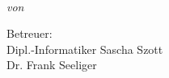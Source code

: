 \begin{titlepage}
    \vspace*{5cm}
    \makeatletter
    \begin{center}
      \begin{Large}
        \@title
      \end{Large}\\[0.1cm]
      \emph{von}\\
      \@author
    \end{center}
    \vspace{7.5 cm}
     Betreuer:\\ 
      \hspace*{1.5cm} Dipl.-Informatiker Sascha Szott\\
      \hspace*{1.5cm} Dr. Frank Seeliger
    \makeatother
  \end{titlepage}
  
  \newpage
  \null
  \thispagestyle{empty}
  \newpage
